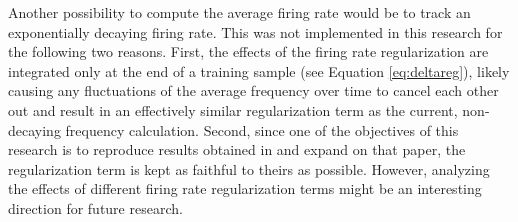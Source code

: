		Another possibility to compute the average firing rate would be to track an exponentially decaying firing rate.
		This was not implemented in this research for the following two reasons. First, the effects of the firing rate regularization are integrated only at the end of a training sample (see Equation \ref{eq:deltareg}), likely causing any fluctuations of the average frequency over time to cancel each other out and result in an effectively similar regularization term as the current, non-decaying frequency calculation.
		Second, since one of the objectives of this research is to reproduce results obtained in \citet{bellec2020solution} and expand on that paper, the regularization term is kept as faithful to theirs as possible.
		However, analyzing the effects of different firing rate regularization terms might be an interesting direction for future research.

